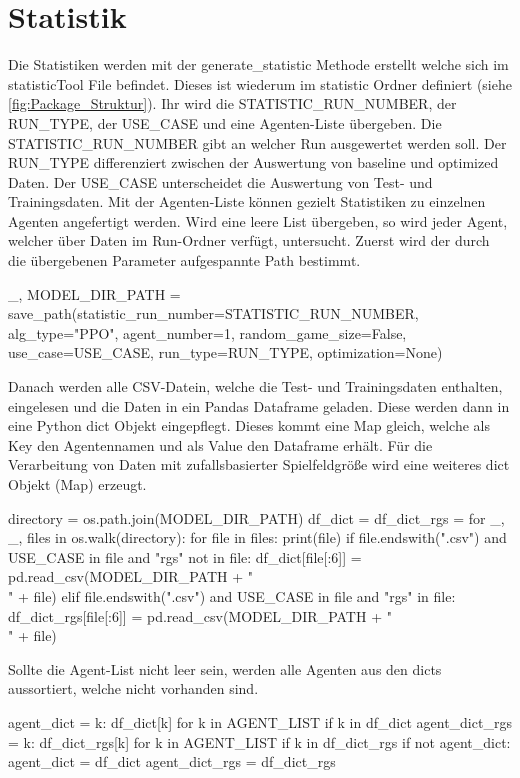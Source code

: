 \section{Statistik}
Die Statistiken werden mit der generate\_statistic Methode erstellt welche sich im statisticTool File befindet. Dieses ist wiederum im statistic Ordner definiert (siehe \ref{fig:Package_Struktur}). Ihr wird die STATISTIC\_RUN\_NUMBER, der RUN\_TYPE, der USE\_CASE und eine Agenten-Liste übergeben. Die STATISTIC\_RUN\_NUMBER gibt an welcher Run ausgewertet werden soll. Der RUN\_TYPE differenziert zwischen der Auswertung von baseline und optimized Daten. Der USE\_CASE unterscheidet die Auswertung von Test- und Trainingsdaten. Mit der Agenten-Liste können gezielt Statistiken zu einzelnen Agenten angefertigt werden. Wird eine leere List übergeben, so wird jeder Agent, welcher über Daten im Run-Ordner verfügt, untersucht.
Zuerst wird der durch die übergebenen Parameter aufgespannte Path bestimmt.
\begin{python}
	_, MODEL_DIR_PATH = save_path(statistic_run_number=STATISTIC_RUN_NUMBER, alg_type="PPO", agent_number=1,
						 random_game_size=False, use_case=USE_CASE, run_type=RUN_TYPE, optimization=None)
\end{python}
Danach werden alle CSV-Datein, welche die Test- und Trainingsdaten enthalten, eingelesen und die Daten in ein Pandas Dataframe geladen. Diese werden dann in eine Python dict Objekt eingepflegt. Dieses kommt eine Map gleich, welche als Key den Agentennamen und als Value den Dataframe erhält. Für die Verarbeitung von Daten mit zufallsbasierter Spielfeldgröße wird eine weiteres dict Objekt (Map) erzeugt.
\begin{python}
	directory = os.path.join(MODEL_DIR_PATH)
	df_dict = {}
	df_dict_rgs = {}
	for _, _, files in os.walk(directory):
		for file in files:
			print(file)
			if file.endswith(".csv") and USE_CASE in file and "rgs" not in file:
				df_dict[file[:6]] = pd.read_csv(MODEL_DIR_PATH + "\\" + file)
			elif file.endswith(".csv") and USE_CASE in file and "rgs" in file:
				df_dict_rgs[file[:6]] = pd.read_csv(MODEL_DIR_PATH + "\\" + file)
\end{python}
Sollte die Agent-List nicht leer sein, werden alle Agenten aus den dicts aussortiert, welche nicht vorhanden sind.
\begin{python}
	agent_dict = {k: df_dict[k] for k in AGENT_LIST if k in df_dict}
	agent_dict_rgs = {k: df_dict_rgs[k] for k in AGENT_LIST if k in df_dict_rgs}
	if not agent_dict:
		agent_dict = df_dict
		agent_dict_rgs = df_dict_rgs
\end{python}
